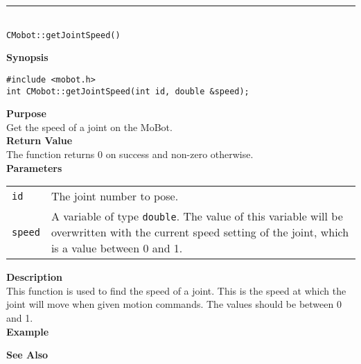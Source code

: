 \noindent
\vspace{5pt}
\rule{4.5in}{0.015in}\\
\noindent
{\LARGE \texttt{CMobot::getJointSpeed()}}\\
{}

\noindent
{\bf Synopsis}\\
\begin{verbatim}
#include <mobot.h>
int CMobot::getJointSpeed(int id, double &speed);
\end{verbatim}

\noindent
{\bf Purpose}\\
Get the speed of a joint on the MoBot.\\

\noindent
{\bf Return Value}\\
The function returns 0 on success and non-zero otherwise.\\

\noindent
{\bf Parameters}
\vspace{-0.1in}
\begin{description}
\item               
\begin{tabular}{p{10 mm}p{145 mm}}
\texttt{id} & The joint number to pose. \\
\texttt{speed} & A variable of type \texttt{double}. The value of this variable
will be overwritten with the current speed setting of the joint, which is a
value between 0 and 1.
\end{tabular}
\end{description}

\noindent
{\bf Description}\\
This function is used to find the speed of a joint.  This is the speed at which the joint will move when given motion commands. The values should be between 0 and 1. \\

\noindent
{\bf Example}\\
\noindent

\noindent
{\bf See Also}\\

